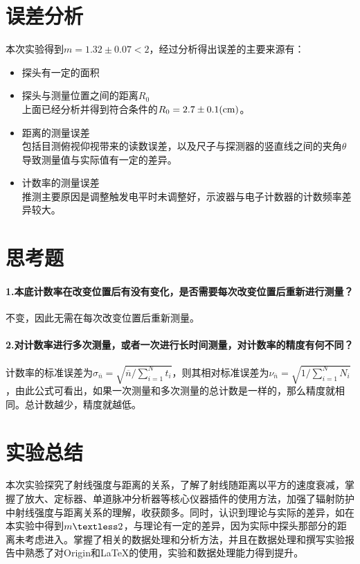 \documentclass[UTF8]{ctexart}
\begin{document}
\section{误差分析}
本次实验得到$ m=1.32\pm0.07<2$，经过分析得出误差的主要来源有：
\begin{itemize}
	\item[1.]
	探头有一定的面积
	\item[2.]
	探头与测量位置之间的距离$ R_{0} $\\
	上面已经分析并得到符合条件的$ R_{0}=2.7\pm0.1(\rm cm) $。
	\item[3.]
	距离的测量误差\\
	包括目测俯视仰视带来的读数误差，以及尺子与探测器的竖直线之间的夹角$ \theta $导致测量值与实际值有一定的差异。
	\item[4.]
	计数率的测量误差\\
	推测主要原因是调整触发电平时未调整好，示波器与电子计数器的计数频率差异较大。
\end{itemize}

\section{思考题}
\paragraph{1.本底计数率在改变位置后有没有变化，是否需要每次改变位置后重新进行测量？}
不变，因此无需在每次改变位置后重新测量。
\paragraph{2.对计数率进行多次测量，或者一次进行长时间测量，对计数率的精度有何不同？}
计数率的标准误差为$ \sigma_{\overline{n}}=\sqrt{\overline{n}/\sum_{i=1}^{N}t_{i}} $，则其相对标准误差为$\nu_{\overline{n}}=\sqrt{1/\sum_{i=1}^{N}N_{i}}$，由此公式可看出，如果一次测量和多次测量的总计数是一样的，那么精度就相同。总计数越少，精度就越低。

\section{实验总结}
本次实验探究了射线强度与距离的关系，了解了射线随距离以平方的速度衰减，掌握了放大、定标器、单道脉冲分析器等核心仪器插件的使用方法，加强了辐射防护中射线强度与距离关系的理解，收获颇多。同时，认识到理论与实际的差异，如在本实验中得到$ m \textless 2$，与理论有一定的差异，因为实际中探头那部分的距离未考虑进入。掌握了相关的数据处理和分析方法，并且在数据处理和撰写实验报告中熟悉了对Origin和\LaTeX{}的使用，实验和数据处理能力得到提升。
\end{document}
